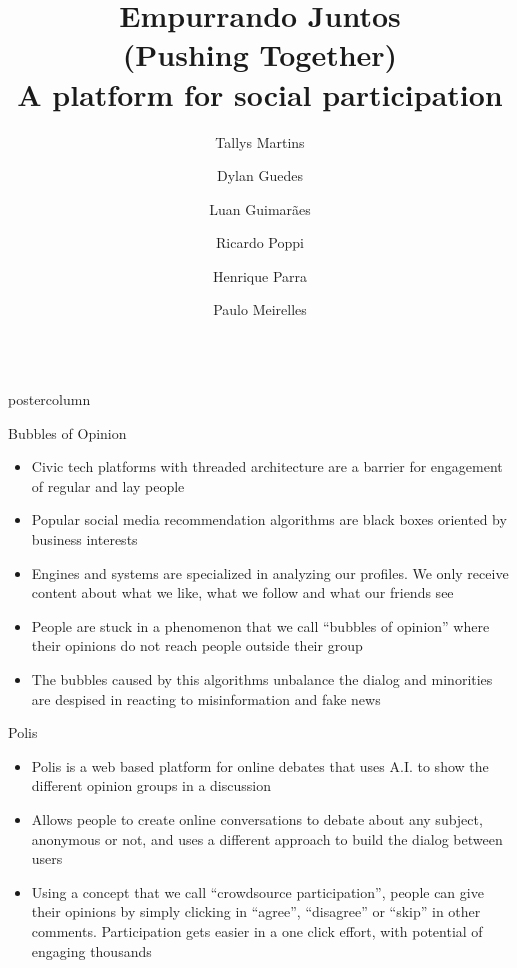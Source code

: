 \documentclass[final,hyperref={pdfpagelabels=false}]{beamer}
\title{\huge\bfseries\hspace*{-1em} Empurrando Juntos\\(Pushing Together)\\A platform for social participation}
\date{}
\author{\large Tallys Martins
\and Dylan Guedes
\and Luan Guimarães \\
\and Ricardo Poppi
\and Henrique Parra
\and Paulo Meirelles
}
\institute[UNB/CD]{University of Brasília and Cidade Democrática Institute, Brazil}
\newlength{\columnheight}
\begin{document}
\begin{frame}
  \begin{columns}
    \begin{column}{.49\textwidth}
      \begin{beamercolorbox}[center,wd=\textwidth]{postercolumn}
        \begin{minipage}[T]{.95\textwidth}
          \parbox[t][\columnheight]{\textwidth}{

\begin{block}{Bubbles of Opinion}
  \begin{itemize}

    \item Civic tech platforms with threaded architecture are a barrier for
    engagement of regular and lay people

    \item Popular social media recommendation algorithms are black boxes 
    oriented by business interests

    \item Engines and systems are specialized in analyzing our profiles. We only receive
    content about what we like, what we follow and what our friends see

    \item People are stuck in a phenomenon that we call ``bubbles of opinion'' where
    their opinions do not reach people outside their group

    \item The bubbles caused by this algorithms unbalance the dialog and minorities
    are despised in reacting to misinformation and fake news
  \end{itemize}
\end{block}

\begin{block}{Polis}
  \begin{itemize}
    \item Polis is a web based platform for online debates that uses A.I. to
    show the different opinion groups in a discussion

    \item Allows people to create online conversations to debate about any subject,
    anonymous or not, and uses a different approach to build the dialog between users

    \item Using a concept that we call ``crowdsource participation'', people can
    give their opinions by simply clicking in ``agree'', ``disagree'' or ``skip''
    in other  comments. Participation gets easier in a one click effort, with
    potential of engaging thousands


\end{itemize}
\end{block}}
\end{minipage}
\end{beamercolorbox}
\end{column}
\end{columns}
\end{frame}
\end{document}
